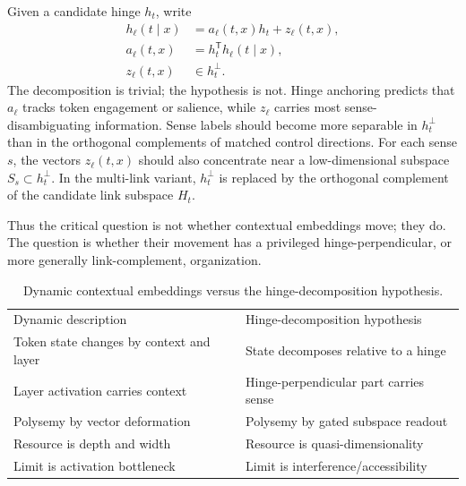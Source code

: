 \documentclass[
  aps,
  reprint,
  superscriptaddress,
  floatfix,
  nofootinbib,
  longbibliography
]{revtex4-2}
\newcommand{\T}{^{\mathsf{T}}}
\begin{document}
Given a candidate hinge $h_t$, write
%
\begin{align}
\label{eq:layer-decomp}
h_\ell(t\mid x)
&=
a_\ell(t,x)h_t+z_\ell(t,x),
\\
a_\ell(t,x)&=h_t\T h_\ell(t\mid x),\nonumber
\\
z_\ell(t,x)&\in h_t^\perp .\nonumber
\end{align}
%
The decomposition is trivial; the hypothesis is not. Hinge anchoring
predicts that $a_\ell$ tracks token engagement or salience, while
$z_\ell$ carries most sense-disambiguating information. Sense labels
should become more separable in $h_t^\perp$ than in the orthogonal
complements of matched control directions. For each sense $s$, the
vectors $z_\ell(t,x)$ should also concentrate near a low-dimensional
subspace $S_s\subset h_t^\perp$. In the multi-link variant, $h_t^\perp$
is replaced by the orthogonal complement of the candidate link subspace
$H_t$.

Thus the critical question is not whether contextual embeddings move;
they do. The question is whether their movement has a privileged
hinge-perpendicular, or more generally link-complement, organization.

\begin{table}[ht]
\caption{Dynamic contextual embeddings versus the hinge-decomposition
hypothesis.}
\label{tab:two-views}
\centering
\begin{minipage}{0.68\textwidth}
\begin{ruledtabular}
\begin{tabular}{@{}ll@{}}
Dynamic description & Hinge-decomposition hypothesis \\
\colrule
Token state changes by context and layer & State decomposes relative to a hinge \\
Layer activation carries context & Hinge-perpendicular part carries sense \\
Polysemy by vector deformation & Polysemy by gated subspace readout \\
Resource is depth and width & Resource is quasi-dimensionality \\
Limit is activation bottleneck & Limit is interference/accessibility \\
\end{tabular}
\end{ruledtabular}
\end{minipage}
\end{table}

\end{document}
